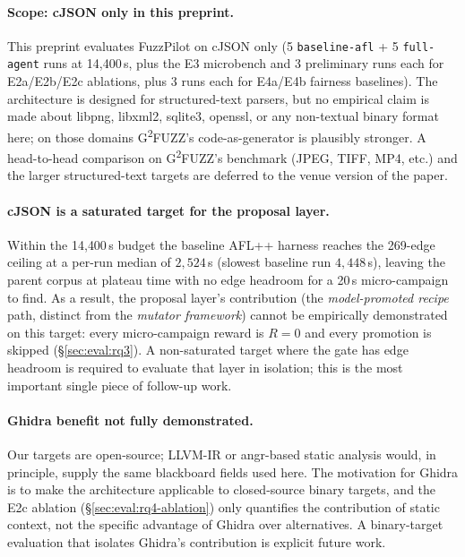 \documentclass[11pt]{article}
\begin{document}
\paragraph{Scope: cJSON only in this preprint.}
This preprint evaluates FuzzPilot on cJSON only (5 \texttt{baseline-afl}
+ 5 \texttt{full-agent} runs at 14{,}400\,s, plus the E3 microbench
and 3 preliminary runs each for E2a/E2b/E2c ablations, plus 3 runs
each for E4a/E4b fairness baselines). The architecture
is designed for structured-text parsers, but no empirical claim is
made about libpng, libxml2, sqlite3, openssl, or any non-textual
binary format here; on those domains
G\textsuperscript{2}FUZZ's code-as-generator is plausibly stronger.
A head-to-head comparison on G\textsuperscript{2}FUZZ's benchmark
(JPEG, TIFF, MP4, etc.) and the larger structured-text targets are
deferred to the venue version of the paper.

\paragraph{cJSON is a saturated target for the proposal layer.}
Within the 14{,}400\,s budget the baseline AFL++ harness reaches
the 269-edge ceiling at a per-run median of $2{,}524$\,s
(slowest baseline run $4{,}448$\,s), leaving the parent
corpus at plateau time with no edge headroom for a 20\,s
micro-campaign to find. As a result, the proposal layer's
contribution (the \emph{model-promoted recipe} path, distinct from
the \emph{mutator framework}) cannot be empirically demonstrated
on this target: every micro-campaign reward is $R{=}0$ and every
promotion is skipped (\S\ref{sec:eval:rq3}). A non-saturated
target where the gate has edge headroom is required to evaluate
that layer in isolation; this is the most important single piece of
follow-up work.

\paragraph{Ghidra benefit not fully demonstrated.}
Our targets are open-source; LLVM-IR or angr-based static analysis
would, in principle, supply the same blackboard fields used here.
The motivation for Ghidra is to make the architecture applicable to
closed-source binary targets, and the E2c ablation
(\S\ref{sec:eval:rq4-ablation}) only quantifies the contribution of static
context, not the specific advantage of Ghidra over alternatives.
A binary-target evaluation that isolates Ghidra's contribution is
explicit future work.
\end{document}
